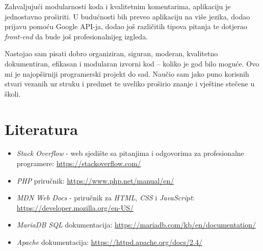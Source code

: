   Zahvaljujući modularnosti koda i kvalitetnim komentarima, aplikaciju je
  jednostavno proširiti. U budućnosti bih preveo aplikaciju na više jezika,
  dodao prijavu pomoću Google API-ja, dodao još različitih tipova pitanja te
  dotjerao \textit{front-end} da bude još profesionalnijeg izgleda.

  Nastojao sam pisati dobro organiziran, siguran, moderan, kvalitetno
  dokumentiran, efikasan i modularan izvorni kod -- koliko je god bilo moguće.
  Ovo mi je najopširniji programerski projekt do sad. Naučio sam jako puno
  korisnih stvari vezanih uz struku i predmet te uveliko proširio znanje i
  vještine stečene u školi.

\listoffigures

\lstlistoflistings
{}

\section*{Literatura}

  \begin{itemize}
    \item \textit{Stack Overflow} - web sjedište sa pitanjima i odgovorima za
      profesionalne programere: \url{https://stackoverflow.com/}
    \item \textit{PHP} priručnik: \url{https://www.php.net/manual/en/}
    \item \textit{MDN Web Docs} - priručnik za \textit{HTML}, \textit{CSS} i
      \textit{JavaScript}: \\\url{https://developer.mozilla.org/en-US/}
    \item \textit{MariaDB SQL} dokumentacija:
      \url{https://mariadb.com/kb/en/documentation/}
    \item \textit{Apache} dokumentacija: \url{https://httpd.apache.org/docs/2.4/}
  \end{itemize}




